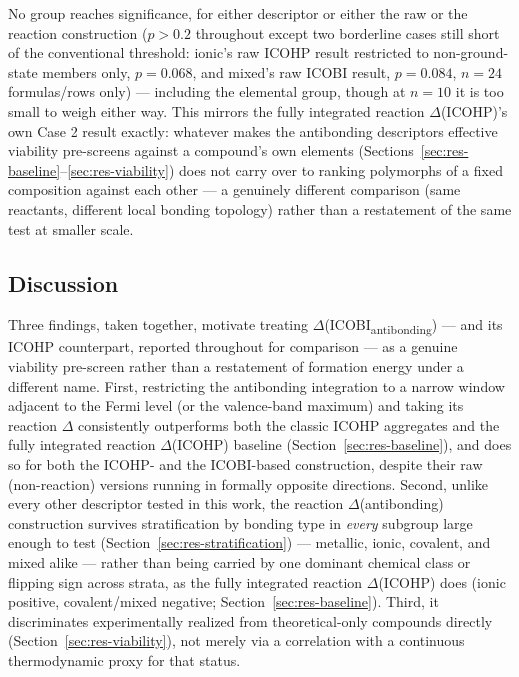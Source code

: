 \documentclass[journal=jpccck,manuscript=article]{achemso}
\begin{document}
No group reaches significance, for either descriptor or either the raw
or the reaction construction ($p>0.2$ throughout except two borderline
cases still short of the conventional threshold: ionic's raw ICOHP
result restricted to non-ground-state members only, $p=0.068$, and
mixed's raw ICOBI result, $p=0.084$, $n=24$ formulas/rows only) ---
including the elemental group, though at $n=10$ it is too small to
weigh either way. This
mirrors the fully integrated reaction $\Delta$(ICOHP)'s own Case 2
result exactly: whatever makes the antibonding descriptors effective
viability pre-screens against a compound's own elements
(Sections~\ref{sec:res-baseline}--\ref{sec:res-viability}) does not carry
over to ranking polymorphs of a fixed composition against each other ---
a genuinely different comparison (same reactants, different local
bonding topology) rather than a restatement of the same test at smaller
scale.

\subsection{Discussion}
\label{sec:res-discussion}

Three findings, taken together, motivate treating
$\Delta$(ICOBI\textsubscript{antibonding}) --- and its ICOHP counterpart,
reported throughout for comparison --- as a genuine viability pre-screen
rather than a restatement of formation energy under a different name. First,
restricting the antibonding integration to a narrow window adjacent to the
Fermi level (or the valence-band maximum) and taking its reaction $\Delta$
consistently outperforms both the classic ICOHP aggregates and the fully
integrated reaction $\Delta$(ICOHP) baseline (Section~\ref{sec:res-baseline}),
and does so for both the ICOHP- and the ICOBI-based construction, despite
their raw (non-reaction) versions running in formally opposite directions.
Second, unlike every other descriptor tested in this work, the reaction
$\Delta$(antibonding) construction survives stratification by bonding type
in \emph{every} subgroup large enough to test (Section~\ref{sec:res-stratification})
--- metallic, ionic, covalent, and mixed alike --- rather than being carried
by one dominant chemical class or flipping sign across strata, as the fully
integrated reaction $\Delta$(ICOHP) does (ionic positive, covalent/mixed
negative; Section~\ref{sec:res-baseline}). Third, it discriminates
experimentally realized from theoretical-only compounds directly
(Section~\ref{sec:res-viability}), not merely via a correlation with a
continuous thermodynamic proxy for that status.
\end{document}
